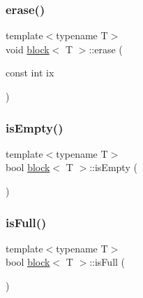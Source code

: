 \mbox{\label{classblock_a797c59cf299d9d79333464b98290ba2b}} 
\subsubsection{\texorpdfstring{erase()}{erase()}\hspace{0.1cm}{\footnotesize\ttfamily [2/2]}}
{\footnotesize\ttfamily template$<$typename T$>$ \\
void \hyperlink{classblock}{block}$<$ T $>$\+::erase (\begin{DoxyParamCaption}\item[{const int}]{ix }\end{DoxyParamCaption})\hspace{0.3cm}{\ttfamily [inline]}}

\mbox{\label{classblock_a7785b6608b8d7f83b0d6c82a31d5ad6a}} 
\subsubsection{\texorpdfstring{is\+Empty()}{isEmpty()}}
{\footnotesize\ttfamily template$<$typename T$>$ \\
bool \hyperlink{classblock}{block}$<$ T $>$\+::is\+Empty (\begin{DoxyParamCaption}{ }\end{DoxyParamCaption})\hspace{0.3cm}{\ttfamily [inline]}}

\mbox{\label{classblock_a87db81c761911a5915bb2bfd61480ff6}} 
\subsubsection{\texorpdfstring{is\+Full()}{isFull()}}
{\footnotesize\ttfamily template$<$typename T$>$ \\
bool \hyperlink{classblock}{block}$<$ T $>$\+::is\+Full (\begin{DoxyParamCaption}{ }\end{DoxyParamCaption})\hspace{0.3cm}{\ttfamily [inline]}}

\mbox{\label{classblock_a02fa9a5b650dba298ce58281394663fa}} 
